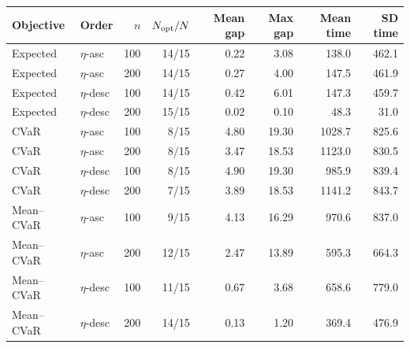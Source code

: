 \begin{tabular}{llrrrrrr}
\toprule
Objective & Order & $n$ & $N_{\rm opt}/N$ & Mean gap & Max gap & Mean time & SD time \\
\midrule
Expected & $\eta$-asc & 100 & 14/15 & 0.22 & 3.08 & 138.0 & 462.1 \\
Expected & $\eta$-asc & 200 & 14/15 & 0.27 & 4.00 & 147.5 & 461.9 \\
Expected & $\eta$-desc & 100 & 14/15 & 0.42 & 6.01 & 147.3 & 459.7 \\
Expected & $\eta$-desc & 200 & 15/15 & 0.02 & 0.10 & 48.3 & 31.0 \\
\midrule
CVaR & $\eta$-asc & 100 & 8/15 & 4.80 & 19.30 & 1028.7 & 825.6 \\
CVaR & $\eta$-asc & 200 & 8/15 & 3.47 & 18.53 & 1123.0 & 830.5 \\
CVaR & $\eta$-desc & 100 & 8/15 & 4.90 & 19.30 & 985.9 & 839.4 \\
CVaR & $\eta$-desc & 200 & 7/15 & 3.89 & 18.53 & 1141.2 & 843.7 \\
\midrule
Mean--CVaR & $\eta$-asc & 100 & 9/15 & 4.13 & 16.29 & 970.6 & 837.0 \\
Mean--CVaR & $\eta$-asc & 200 & 12/15 & 2.47 & 13.89 & 595.3 & 664.3 \\
Mean--CVaR & $\eta$-desc & 100 & 11/15 & 0.67 & 3.68 & 658.6 & 779.0 \\
Mean--CVaR & $\eta$-desc & 200 & 14/15 & 0.13 & 1.20 & 369.4 & 476.9 \\
\bottomrule
\end{tabular}
